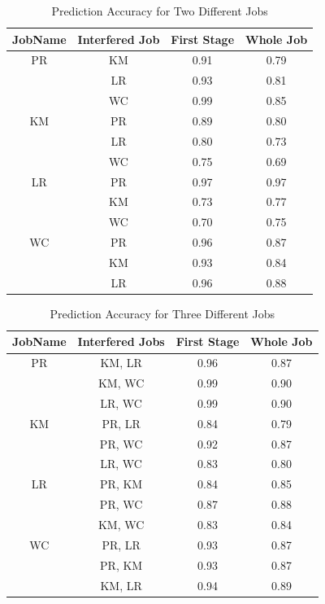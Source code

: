 \begin{table}[!t]
\renewcommand{\arraystretch}{1.3}
\caption{Prediction Accuracy for Two Different Jobs}
\label{table_twojobs}
\centering
\begin{tabular}{c|c|c|c}
\hline
\bfseries JobName & \bfseries Interfered Job & \bfseries First Stage & \bfseries Whole Job\\
\hline\hline
PR & KM & 0.91 & 0.79\\
& LR & 0.93 & 0.81\\
& WC & 0.99 & 0.85\\
\hline
KM & PR & 0.89 & 0.80\\
& LR & 0.80 & 0.73\\
& WC & 0.75 & 0.69\\
\hline
LR & PR & 0.97 & 0.97 \\
& KM & 0.73 & 0.77\\
& WC & 0.70 & 0.75\\ 
\hline
WC & PR & 0.96 & 0.87\\
& KM & 0.93 & 0.84\\
& LR & 0.96 & 0.88\\
\hline
\end{tabular}
\end{table}
\begin{table}[!t]
\renewcommand{\arraystretch}{1.3}
\caption{Prediction Accuracy for Three Different Jobs}
\label{table_threejobs}
\centering
\begin{tabular}{c|c|c|c}
\hline
\bfseries JobName & \bfseries Interfered Jobs & \bfseries First Stage & \bfseries Whole Job\\
\hline\hline
PR & KM, LR & 0.96 & 0.87\\
& KM, WC & 0.99 & 0.90\\
& LR, WC & 0.99 & 0.90\\
\hline
KM & PR, LR & 0.84 & 0.79\\
& PR, WC & 0.92 & 0.87\\
& LR, WC & 0.83 & 0.80\\
\hline
LR & PR, KM & 0.84 & 0.85\\
& PR, WC & 0.87 & 0.88\\
& KM, WC & 0.83 & 0.84\\
\hline
WC & PR, LR & 0.93 & 0.87\\
& PR, KM & 0.93 & 0.87\\
& KM, LR & 0.94 & 0.89\\
\hline
\end{tabular}
\end{table}
